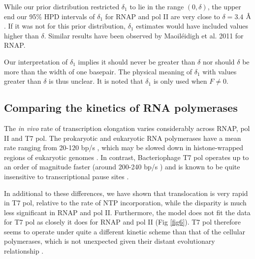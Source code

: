 \documentclass[10pt,letterpaper]{article}
\newcommand{\angstrom}{\mbox{\normalfont\AA}}
\begin{document}
While our prior distribution restricted $\delta_1$ to lie in the range $(0, \delta)$, the upper end our 95\% HPD intervals of $\delta_1$ for RNAP and pol II are very close to $\delta = 3.4$ $\angstrom$. If it was not for this prior distribution, $\delta_1$ estimates would have included values higher than $\delta$. Similar results have been observed by Maoil{\'e}idigh et al. 2011 \cite{maoileidigh2011unified} for RNAP. \par

Our interpretation of $\delta_1$ implies it should never be greater than $\delta$ nor should $\delta$ be more than the width of one basepair. The physical meaning of $\delta_1$ with values greater than $\delta$ is thus unclear. It is noted that $\delta_1$ is only used when $F \neq 0$. \\





\subsection*{Comparing the kinetics of RNA polymerases}




The \textit{ in vivo} rate of transcription elongation varies considerably across  RNAP, pol II and T7 pol. The prokaryotic and eukaryotic RNA polymerases have a mean rate ranging from 20-120 bp/s \cite{iost1992bacteriophage, vogel1994rna, ryals1982temperature, tennyson1995human, darzacq2007vivo, mason2005distinction, kainov2004packaging}, which may be slowed down in histone-wrapped regions of eukaryotic genomes \cite{hodges2009nucleosomal}. In contrast, Bacteriophage T7 pol operates up to an order of magnitude faster (around 200-240 bp/s \cite{iost1992bacteriophage, makarova1995transcribing}) and is known to be quite insensitive to transcriptional pause sites \cite{skinner2004promoter, thomen2008t7}.



In additional to these differences, we have shown that translocation is very rapid in T7 pol, relative to the rate of NTP incorporation, while the disparity is much less significant in RNAP and pol II. Furthermore, the model does not fit the data for T7 pol as closely it does for RNAP and pol II (Fig \ref{fig6}).  T7 pol therefore seems to operate under quite a different kinetic scheme than that of the cellular polymerases, which is not unexpected given their distant evolutionary relationship \cite{sousa1993crystal}. \par
\end{document}

